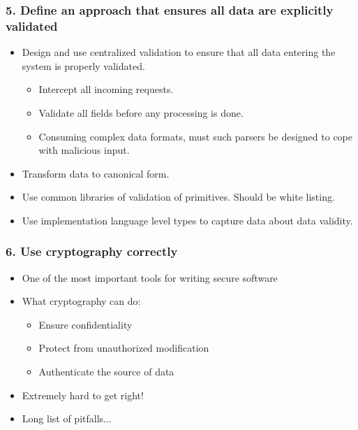\documentclass[12pt,norsk]{beamer}
\begin{document}
\begin{frame}

	\frametitle{5. Define an approach that ensures all data are explicitly validated}
	
	\begin{itemize}
		\item Design and use centralized validation to ensure that all data entering the system is properly validated. 
		\begin{itemize}
			\item Intercept all incoming requests.
			\item Validate all fields before any processing is done.
			\item Consuming complex data formats, must such parsers be designed to cope with malicious input.

		\end{itemize}

		\item Transform data to canonical form.
		\item Use common libraries of validation of primitives. Should be white listing. 
		\item Use implementation language level types to capture data about data validity. 				
	
	\end{itemize}
	

\end{frame}

\begin{frame}

	\frametitle{6. Use cryptography correctly}
	
	\begin{itemize}
		
	\item One of the most important tools for writing secure software
	\item What cryptography can do:
	
	\begin{itemize}
	
		\item Ensure confidentiality	
		\item Protect from unauthorized modification
		\item Authenticate the source of data
	\end{itemize}	 
	
	\item Extremely hard to get right!
	\item Long list of pitfalls...	
	
	\end{itemize}

\end{frame}
\end{document}
